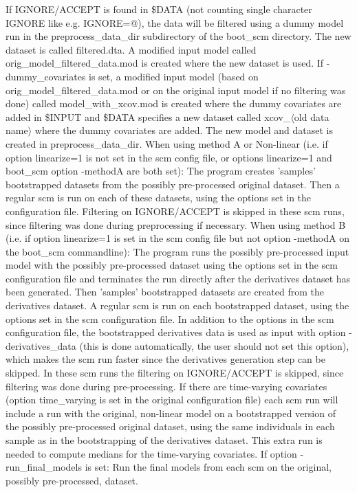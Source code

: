 If IGNORE/ACCEPT is found in \$DATA (not counting single character IGNORE like e.g. IGNORE=@), 
the data will be filtered using a dummy model run in the preprocess\_data\_dir subdirectory of the boot\_scm directory. The new dataset is called filtered.dta. 
A modified input model called orig\_model\_filtered\_data.mod is created where the new dataset is used.
If -dummy\_covariates is set, a modified input model (based on orig\_model\_filtered\_data.mod or on the original input model if no filtering was done) called model\_with\_xcov.mod is created where the dummy covariates are added in \$INPUT and \$DATA specifies a new dataset called xcov\_$\langle$old data name$\rangle$ where the dummy covariates are added. The new model and dataset is created in preprocess\_data\_dir. 
When using method A or Non-linear (i.e. if option linearize=1 is not set in the scm config file, 
or options linearize=1 and boot\_scm option -methodA are both set): The program creates 'samples' bootstrapped datasets from the possibly pre-processed original dataset. 
Then a regular scm is run on each of these datasets, using the options set in the configuration file. Filtering on IGNORE/ACCEPT is skipped in these scm runs, since filtering was done during preprocessing if necessary. 
When using method B (i.e. if option linearize=1 is set in the scm config file but not option -methodA on the boot\_scm commandline): 
The program runs the possibly pre-processed input model with the possibly pre-processed dataset using the options set in the scm configuration 
file and terminates the run directly after the derivatives dataset has been generated. Then 'samples' bootstrapped datasets are created from the 
derivatives dataset. 
A regular scm is run on each bootstrapped dataset, using the options set in the scm configuration file. 
In addition to the options in the scm configuration file, 
the bootstrapped derivatives data is used as input with option -derivatives\_data (this is done automatically, the user should not set this option), 
which makes the scm run faster since the derivatives generation step can be skipped. In these scm runs the filtering on IGNORE/ACCEPT is skipped, 
since filtering was done during pre-processing. 
If there are time-varying covariates (option time\_varying is set in the original configuration file) each scm run will include a run with the 
original, non-linear model on a bootstrapped version of the possibly pre-processed original dataset, 
using the same individuals in each sample as in the bootstrapping of the derivatives dataset. 
This extra run is needed to compute medians for the time-varying covariates. 
If option -run\_final\_models is set: Run the final models from each scm on the original, possibly pre-processed, dataset.

